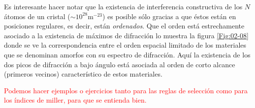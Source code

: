 Es interesante hacer notar que la existencia de interferencia constructiva de los $N$ átomos de un cristal ($\sim 10^{28} \text{m}^{-23}$) es posible sólo gracias a que éstos están en posiciones regulares, es decir, están \textit{ordenados}. Que el orden está estrechamente asociado a la existencia de máximos de difracción lo muestra la figura \ref{Fig:02-08} donde se ve la correspondencia entre el orden espacial limitado de los materiales que se denominan amorfos con su espectro de difracción. Aquí la existencia de los dos picos de difracción a bajo ángulo está asociada al orden de corto alcance (primeros vecinos) característico de estos materiales.

\begin{Anotacion}
\textcolor{red}{Podemos hacer ejemplos o ejercicios tanto para las reglas de selección como para los índices de miller, para que se entienda bien.}
\end{Anotacion}











